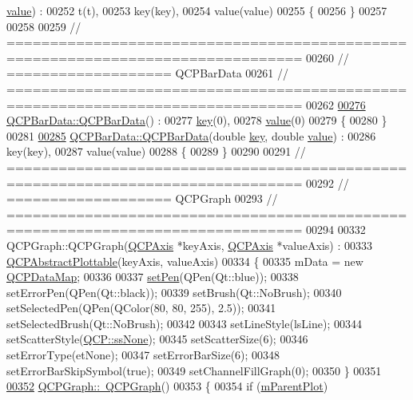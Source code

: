 \begin{DoxyCode}
      \hyperlink{a00116_aee90379adb0307effb138f4871edbc5c}{value}) :
00252   t(t),
00253   key(key),
00254   value(value)
00255 \{
00256 \}
00257 
00258 
00259 \textcolor{comment}{// ================================================================================}
00260 \textcolor{comment}{// =================== QCPBarData}
00261 \textcolor{comment}{// ================================================================================}
00262 
\hypertarget{a00115_source_l00276}{}\hyperlink{a00026_a8d214eda9ef41bc6da2a908a09623836}{00276} \hyperlink{a00026_a8d214eda9ef41bc6da2a908a09623836}{QCPBarData::QCPBarData}() :
00277   \hyperlink{a00116_a94bb892c30911cd62cba0707a5395be4}{key}(0),
00278   \hyperlink{a00116_aee90379adb0307effb138f4871edbc5c}{value}(0)
00279 \{
00280 \}
00281 
\hypertarget{a00115_source_l00285}{}\hyperlink{a00026_ac0bb7ede5373a7b18713418fa78f972d}{00285} \hyperlink{a00026_a8d214eda9ef41bc6da2a908a09623836}{QCPBarData::QCPBarData}(\textcolor{keywordtype}{double} \hyperlink{a00116_a94bb892c30911cd62cba0707a5395be4}{key}, \textcolor{keywordtype}{double} \hyperlink{a00116_aee90379adb0307effb138f4871edbc5c}{value}) :
00286   key(key),
00287   value(value)
00288 \{
00289 \}
00290 
00291 \textcolor{comment}{// ================================================================================}
00292 \textcolor{comment}{// =================== QCPGraph}
00293 \textcolor{comment}{// ================================================================================}
00294 
00332 QCPGraph::QCPGraph(\hyperlink{a00025}{QCPAxis} *keyAxis, \hyperlink{a00025}{QCPAxis} *valueAxis) :
00333   \hyperlink{a00024}{QCPAbstractPlottable}(keyAxis, valueAxis)
00334 \{
00335   mData = \textcolor{keyword}{new} \hyperlink{a00116_a84a9c4a4c2216ccfdcb5f3067cda76e3}{QCPDataMap};
00336   
00337   \hyperlink{a00116_a499165f4744b6d22da7b24295910fb2c}{setPen}(QPen(Qt::blue));
00338   setErrorPen(QPen(Qt::black));
00339   setBrush(Qt::NoBrush);
00340   setSelectedPen(QPen(QColor(80, 80, 255), 2.5));
00341   setSelectedBrush(Qt::NoBrush);
00342   
00343   setLineStyle(lsLine);
00344   setScatterStyle(\hyperlink{a00143_af66d0711d42fe78d96c28abadc67f26fa3ee9f603bc4623e9b98011e8829aad1d}{QCP::ssNone});
00345   setScatterSize(6);
00346   setErrorType(etNone);
00347   setErrorBarSize(6);
00348   setErrorBarSkipSymbol(\textcolor{keyword}{true});
00349   setChannelFillGraph(0);
00350 \}
00351 
\hypertarget{a00115_source_l00352}{}\hyperlink{a00031_ae9998cfb9d379ac0ef3fbd6995cfbd76}{00352} \hyperlink{a00031_ae9998cfb9d379ac0ef3fbd6995cfbd76}{QCPGraph::~QCPGraph}()
00353 \{
00354   \textcolor{keywordflow}{if} (\hyperlink{a00044_aa2a528433e44db02b8aef23c1f9f90ed}{mParentPlot})

\end{DoxyCode}
